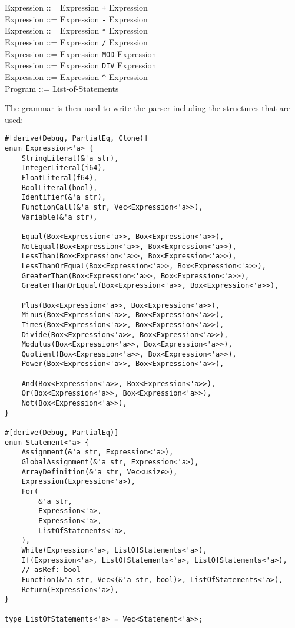 \documentclass{article}
\begin{document}
\noindent
Expression ::= Expression \texttt{+} Expression\\
Expression ::= Expression \texttt{-} Expression\\
Expression ::= Expression \texttt{*} Expression\\
Expression ::= Expression \texttt{/} Expression\\
Expression ::= Expression \texttt{MOD} Expression\\
Expression ::= Expression \texttt{DIV} Expression\\
Expression ::= Expression \texttt{\textasciicircum{}} Expression\\

\noindent
Program ::= List-of-Statements

The grammar is then used to write the parser including the structures that are
used:

\begin{verbatim}
#[derive(Debug, PartialEq, Clone)]
enum Expression<'a> {
    StringLiteral(&'a str),
    IntegerLiteral(i64),
    FloatLiteral(f64),
    BoolLiteral(bool),
    Identifier(&'a str),
    FunctionCall(&'a str, Vec<Expression<'a>>),
    Variable(&'a str),

    Equal(Box<Expression<'a>>, Box<Expression<'a>>),
    NotEqual(Box<Expression<'a>>, Box<Expression<'a>>),
    LessThan(Box<Expression<'a>>, Box<Expression<'a>>),
    LessThanOrEqual(Box<Expression<'a>>, Box<Expression<'a>>),
    GreaterThan(Box<Expression<'a>>, Box<Expression<'a>>),
    GreaterThanOrEqual(Box<Expression<'a>>, Box<Expression<'a>>),

    Plus(Box<Expression<'a>>, Box<Expression<'a>>),
    Minus(Box<Expression<'a>>, Box<Expression<'a>>),
    Times(Box<Expression<'a>>, Box<Expression<'a>>),
    Divide(Box<Expression<'a>>, Box<Expression<'a>>),
    Modulus(Box<Expression<'a>>, Box<Expression<'a>>),
    Quotient(Box<Expression<'a>>, Box<Expression<'a>>),
    Power(Box<Expression<'a>>, Box<Expression<'a>>),

    And(Box<Expression<'a>>, Box<Expression<'a>>),
    Or(Box<Expression<'a>>, Box<Expression<'a>>),
    Not(Box<Expression<'a>>),
}

#[derive(Debug, PartialEq)]
enum Statement<'a> {
    Assignment(&'a str, Expression<'a>),
    GlobalAssignment(&'a str, Expression<'a>),
    ArrayDefinition(&'a str, Vec<usize>),
    Expression(Expression<'a>),
    For(
        &'a str,
        Expression<'a>,
        Expression<'a>,
        ListOfStatements<'a>,
    ),
    While(Expression<'a>, ListOfStatements<'a>),
    If(Expression<'a>, ListOfStatements<'a>, ListOfStatements<'a>),
    // asRef: bool
    Function(&'a str, Vec<(&'a str, bool)>, ListOfStatements<'a>),
    Return(Expression<'a>),
}

type ListOfStatements<'a> = Vec<Statement<'a>>;
\end{verbatim}
\end{document}
